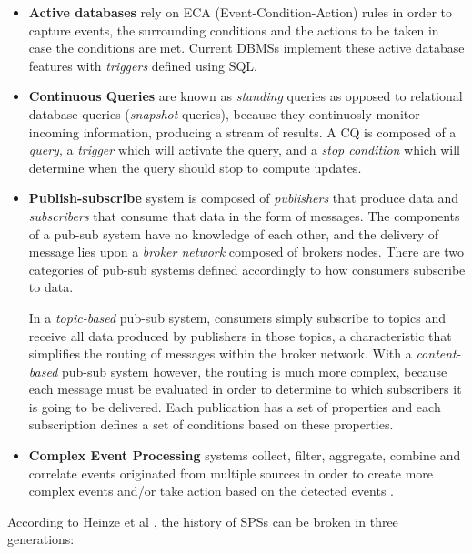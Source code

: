\documentclass[ppgc,diss,english]{iiufrgs}
\begin{document}
\begin{itemize}
\item \textbf{Active databases} rely on ECA (Event-Condition-Action) rules in order to capture events, the surrounding conditions and the actions to be taken in case the conditions are met. Current DBMSs implement these active database features with \emph{triggers} defined using SQL.

\item \textbf{Continuous Queries} are known as \emph{standing} queries as opposed to relational database queries (\emph{snapshot} queries), because they continuosly monitor incoming information, producing a stream of results. A CQ is composed of a \emph{query}, a \emph{trigger} which will activate the query, and a \emph{stop condition} which will determine when the query should stop to compute updates.

\item \textbf{Publish-subscribe} system is composed of \emph{publishers} that produce data and \emph{subscribers} that consume that data in the form of messages. The components of a pub-sub system have no knowledge of each other, and the delivery of message lies upon a \emph{broker network} composed of brokers nodes. There are two categories of pub-sub systems defined accordingly to how consumers subscribe to data.

In a \emph{topic-based} pub-sub system, consumers simply subscribe to topics and receive all data produced by publishers in those topics, a characteristic that simplifies the routing of messages within the broker network. With a \emph{content-based} pub-sub system however, the routing is much more complex, because each message must be evaluated in order to determine to which subscribers it is going to be delivered. Each publication has a set of properties and each subscription defines a set of conditions based on these properties.

\item \textbf{Complex Event Processing} systems collect, filter, aggregate, combine and correlate events originated from multiple sources in order to create more complex events and/or take action based on the detected events \cite{robins2010complex}.
\end{itemize}



According to Heinze et al \cite{heinze2014cloud}, the history of SPSs can be broken in three generations:
\end{document}
